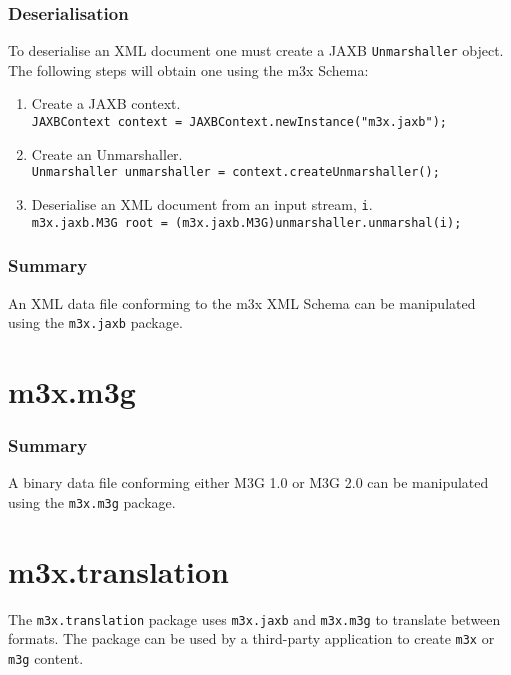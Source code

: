 \subsubsection{Deserialisation}
To deserialise an XML document one must create a JAXB \texttt{Unmarshaller} object. The following steps will obtain one using the m3x Schema:
\begin{enumerate}
\item Create a JAXB context.\\\texttt{JAXBContext context = JAXBContext.newInstance("m3x.jaxb");}
\item Create an Unmarshaller.\\\texttt{Unmarshaller unmarshaller = context.createUnmarshaller();}
\item Deserialise an XML document from an input stream, \texttt{i}.\\\texttt{m3x.jaxb.M3G root = (m3x.jaxb.M3G)unmarshaller.unmarshal(i);}
\end{enumerate}


\subsubsection{Summary}
An XML data file conforming to the m3x XML Schema can be manipulated using the \texttt{m3x.jaxb} package.




\section{m3x.m3g}

\subsubsection{Summary}
A binary data file conforming either M3G 1.0 or M3G 2.0 can be manipulated using the \texttt{m3x.m3g} package.


\section{m3x.translation}
The \texttt{m3x.translation} package uses \texttt{m3x.jaxb} and \texttt{m3x.m3g} to translate between formats. The package can be used by a third-party application to create \texttt{m3x} or \texttt{m3g} content.


